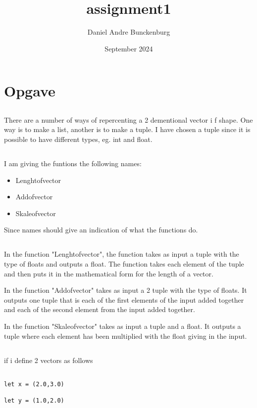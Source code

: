 \documentclass{article}
\title{assignment1}
\author{Daniel Andre Bunckenburg}
\date{September 2024}
\begin{document}
\section{Opgave}
\subsection{}

There are a number of ways of repercenting a 2 dementional vector i f shape. One way is to make a list, another is to make a tuple. I have chosen a tuple since it is possible to have different types, eg. int and float.



\subsection{}
I am giving the funtions the following names:

\begin{itemize}
  \item Lenghtofvector
  \item Addofvector
  \item Skaleofvector
\end{itemize}
Since names should give an indication of what the functions do. 

\subsection{}

In the function "Lenghtofvector", the function takes as input a tuple with the type of floats and outputs a float. The function takes each element of the tuple and then puts it in the mathematical form for the length of a vector.

In the function "Addofvector" takes as input a 2 tuple with the type of floats. It outputs one tuple that is each of the first elements of the input added together and each of the second element from the input added together.

In the function "Skaleofvector" takes as input a tuple and a float. It outputs a tuple where each element has been multiplied with the float giving in the input.


\subsection{}

if i define 2 vectors as follows
    \begin{lstlisting}

let x = (2.0,3.0)

let y = (1.0,2.0)

    \end{lstlisting}
\end{document}
